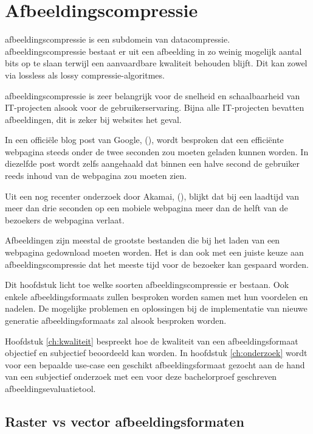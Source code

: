 \chapter{Afbeeldingscompressie}
\label{ch:afbeeldingscompressie}

\Gls{afbeeldingscompressie} is een subdomein van \gls{datacompressie}. \Gls{afbeeldingscompressie} bestaat er uit een afbeelding in zo weinig mogelijk aantal \glspl{bit} op te slaan terwijl een aanvaardbare kwaliteit behouden blijft. Dit kan zowel via \gls{lossless} als \gls{lossy} \glspl{compressie-algoritme}.

\Gls{afbeeldingscompressie} is zeer belangrijk voor de snelheid en schaalbaarheid van IT-projecten alsook voor de gebruikerservaring. Bijna alle IT-projecten bevatten afbeeldingen, dit is zeker bij websites het geval.

In een officiële blog post van Google,  (\cite{googleinternetspeed}), wordt besproken dat een efficiënte webpagina steeds onder de twee seconden zou moeten geladen kunnen worden. In diezelfde post wordt zelfs aangehaald dat binnen een halve second de gebruiker reeds inhoud van de webpagina zou moeten zien.

Uit een nog recenter onderzoek door Akamai,  (\cite{akamaiinternetspeed}), blijkt dat bij een laadtijd van meer dan drie seconden op een mobiele webpagina meer dan de helft van de bezoekers de webpagina verlaat.

Afbeeldingen zijn meestal de grootste bestanden die bij het laden van een webpagina gedownload moeten worden. Het is dan ook met een juiste keuze aan \gls{afbeeldingscompressie} dat het meeste tijd voor de bezoeker kan gespaard worden. 

Dit hoofdstuk licht toe welke soorten \gls{afbeeldingscompressie} er bestaan. Ook enkele \glspl{afbeeldingsformaat} zullen besproken worden samen met hun voordelen en nadelen. De mogelijke problemen en oplossingen bij de implementatie van nieuwe generatie \glspl{afbeeldingsformaat} zal alsook besproken worden.

Hoofdstuk \ref{ch:kwaliteit} bespreekt hoe de kwaliteit van een \gls{afbeeldingsformaat} objectief en subjectief beoordeeld kan worden. In hoofdstuk \ref{ch:onderzoek} wordt voor een bepaalde \gls{use-case} een geschikt \gls{afbeeldingsformaat} gezocht aan de hand van een subjectief onderzoek met een voor deze bachelorproef geschreven \gls{afbeeldingsevaluatietool}.

\section{Raster vs vector afbeeldingsformaten}
\label{sec:afbeeldingscompressie-raster-vector}

